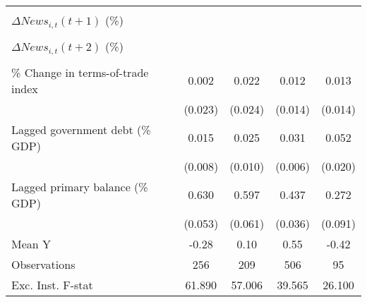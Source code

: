 {\begin{tabular}{l*{4}{c}}
                    &                     &                     &                     &                     \\
\addlinespace
$ \Delta News_{i,t}(t+1)$ (\%)&                     &                     &                     &                     \\
                    &                     &                     &                     &                     \\
\addlinespace
$ \Delta News_{i,t}(t+2)$ (\%)&                     &                     &                     &                     \\
                    &                     &                     &                     &                     \\
\addlinespace
\% Change in terms-of-trade index&       0.002         &       0.022         &       0.012         &       0.013         \\
                    &     (0.023)         &     (0.024)         &     (0.014)         &     (0.014)         \\
\addlinespace
Lagged government debt (\% GDP)&       0.015\sym{*}  &       0.025\sym{**} &       0.031\sym{***}&       0.052\sym{***}\\
                    &     (0.008)         &     (0.010)         &     (0.006)         &     (0.020)         \\
\addlinespace
Lagged primary balance (\% GDP)&       0.630\sym{***}&       0.597\sym{***}&       0.437\sym{***}&       0.272\sym{***}\\
                    &     (0.053)         &     (0.061)         &     (0.036)         &     (0.091)         \\
\midrule
Mean Y              &       -0.28         &        0.10         &        0.55         &       -0.42         \\
Observations        &         256         &         209         &         506         &          95         \\
Exc. Inst. F-stat   &      61.890         &      57.006         &      39.565         &      26.100         \\
\bottomrule
\end{tabular}
}
